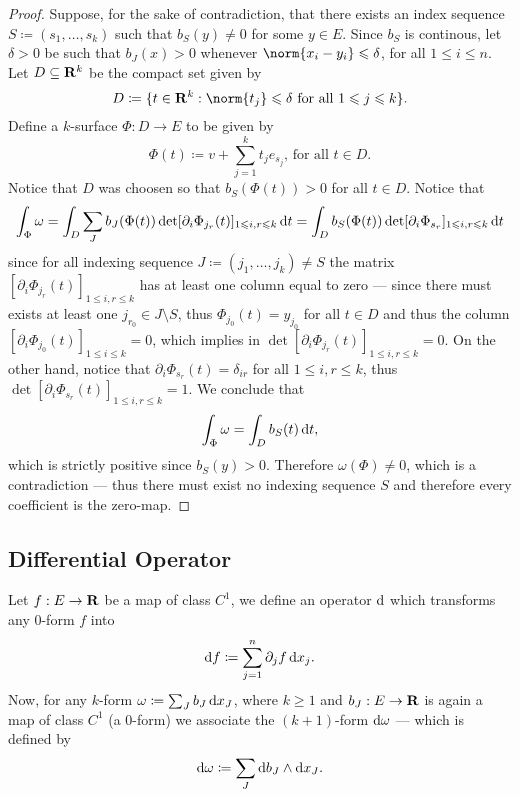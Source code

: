 \begin{proof}
Suppose, for the sake of contradiction, that there exists an index sequence \(S
\coloneq (s_1, \dots, s_{k})\) such that \(b_{S}(y) \neq 0\) for some \(y \in
E\). Since \(b_{S}\) is continous, let \(\delta > 0\) be such that \(b_J(x) >
0\) whenever \(\norm{x_i - y_i} \leq \delta\), for all \(1 \leq i \leq n\). Let
\(D \subseteq \mathbf{R}^k\) be the compact set given by
\[
  D \coloneq \{t \in \R^{k} : \norm{t_j} \leq \delta
  \text{ for all } 1 \leq j \leq k\}.
\]
Define a \(k\)-surface \(\Phi: D \to E\) to be given by
\[
  \Phi(t) \coloneq v + \sum_{j=1}^k t_j e_{s_j}\text{, for all } t \in D.
\]
Notice that \(D\) was choosen so that \(b_S(\Phi(t)) > 0\) for all \(t \in
D\). Notice that
\[
  \int_{\Phi} \omega = \int_D \sum_J b_J(\Phi(t))
  \det[\partial_i \Phi_{j_r}(t)]_{1 \leqslant i, r \leqslant k}\, \mathrm{d} t
  = \int_D b_S(\Phi(t)) \det[\partial_i \Phi_{s_r}]_{1 \leqslant i, r \leqslant k}\, \mathrm{d} t
\]
since for all indexing sequence \(J \coloneq (j_1, \dots, j_k) \neq S\)
the matrix \([\partial_i \Phi_{j_r}(t)]_{1 \leq i, r \leq k}\) has at least one
column equal to zero --- since there must exists at least one \(j_{r_0} \in J
\setminus S\), thus \(\Phi_{j_0}(t) = y_{j_0}\) for all \(t \in D\) and thus the
column \([\partial_i \Phi_{j_0}(t)]_{1 \leq i \leq k} = 0\), which implies in
\(\det [\partial_i \Phi_{j_r}(t)]_{1 \leq i, r \leq k} = 0\). On the other hand,
notice that \(\partial_i \Phi_{s_r}(t) = \delta_{i r}\) for all \(1 \leq i, r
\leq k\), thus \(\det [\partial_i \Phi_{s_r}(t)]_{1 \leq i, r \leq k} = 1\). We
conclude that
\[
  \int_{\Phi} \omega = \int_D b_S(t)\, \mathrm{d} t,
\]
which is strictly positive since \(b_S(y) > 0\). Therefore \(\omega(\Phi) \neq
0\), which is a contradiction --- thus there must exist no indexing sequence
\(S\) and therefore every coefficient is the zero-map.
\end{proof}

\subsection{Differential Operator}

\begin{definition}
\label{def:differential-operator-form}
Let \(f: E \to \mathbf{R}\) be a map of class \(C^1\), we define an operator \(\mathrm{d}\)
which transforms any \(0\)-form \(f\) into
\[
  \mathrm{d} f \coloneq \sum_{j=1}^n \partial_j f\, \mathrm{d} x_j.
\]
Now, for any \(k\)-form \(\omega \coloneq \sum_J b_J\, \mathrm{d} x_J\), where \(k
\geq 1\) and \(b_J: E \to \mathbf{R}\) is again a map of class \(C^1\) (a \(0\)-form) we
associate the \((k+1)\)-form \(\mathrm{d} \omega\) --- which is defined by
\[
  \mathrm{d} \omega \coloneq \sum_J \mathrm{d} b_J \wedge \mathrm{d} x_{J}.
\]
\end{definition}

